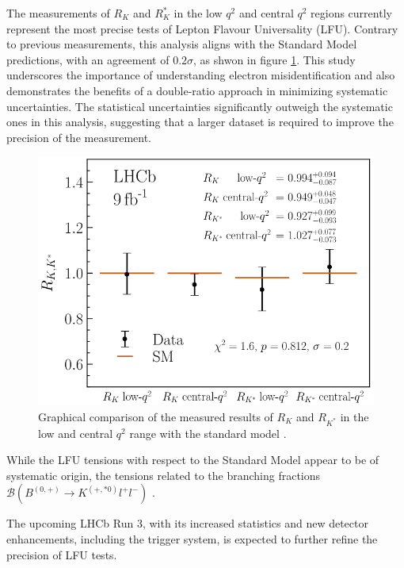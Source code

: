 The measurements of $R_K$ and $R_K^*$ in the low $q^2$ 
and central $q^2$ regions currently represent the most 
precise tests of Lepton Flavour Universality (LFU). 
Contrary to previous measurements, this analysis aligns 
with the Standard Model predictions, with an agreement of 
$\num{0.2}\sigma$, as shwon in figure \ref{fig:results}. 
This study underscores the importance of understanding 
electron misidentification and also demonstrates the 
benefits of a double-ratio approach in minimizing 
systematic uncertainties. The statistical uncertainties 
significantly outweigh the systematic ones in this 
analysis, suggesting that a larger dataset is required 
to improve the precision of the measurement.

\begin{figure}
    \centering
    \includegraphics[width=\linewidth]{figures/results.png}
    \caption{Graphical comparison of the measured results of $R_K$ and $R_{K^*}$ in the low and central $q^2$ range with the standard model \cite{lhcbcollaboration2022measurement}.}
    \label{fig:results}
\end{figure}

While the LFU tensions with respect to the Standard Model 
appear to be of systematic origin, the tensions related to 
the branching fractions $\mathcal{B}(B^{(0,+)}\to K^{(+,*0)}l^+l^-)$ 
 \cite{Branchingfraction}.

The upcoming LHCb Run 3, with its increased statistics and 
new detector enhancements, including the trigger system, is 
expected to further refine the precision of LFU tests.